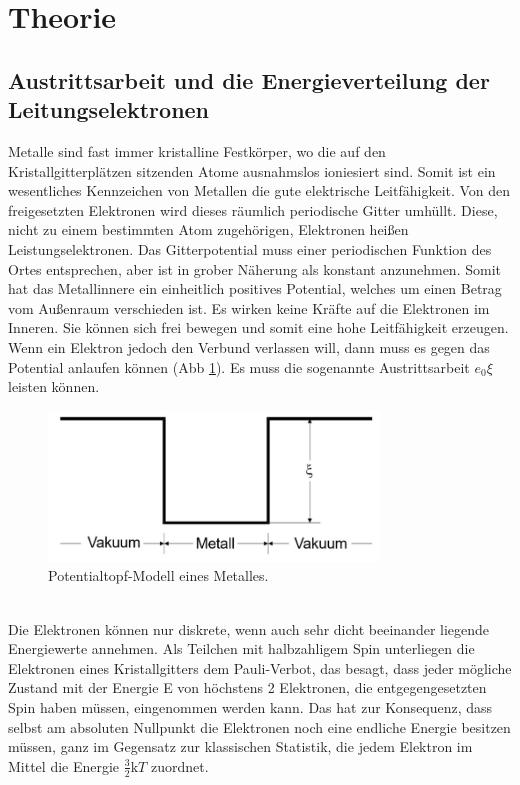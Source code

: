 \section{Theorie}
\label{sec:Theorie}

\subsection{Austrittsarbeit und die Energieverteilung der Leitungselektronen}
Metalle sind fast immer kristalline Festkörper, wo die auf den Kristallgitterplätzen sitzenden Atome ausnahmslos ioniesiert sind.
Somit ist ein wesentliches Kennzeichen von Metallen die gute elektrische Leitfähigkeit.
Von den freigesetzten Elektronen wird dieses räumlich periodische Gitter umhüllt.
Diese, nicht zu einem bestimmten Atom zugehörigen, Elektronen heißen Leistungselektronen.
Das Gitterpotential muss einer periodischen Funktion des Ortes entsprechen, aber ist in grober Näherung als konstant anzunehmen.
Somit hat das Metallinnere ein einheitlich positives Potential, welches um einen Betrag \Phi vom Außenraum verschieden ist.
Es wirken keine Kräfte auf die Elektronen im Inneren.
Sie können sich frei bewegen und somit eine hohe Leitfähigkeit erzeugen.
Wenn ein Elektron jedoch den Verbund verlassen will, dann muss es gegen das Potential \xi anlaufen können (Abb \ref{fig:abb1}).
Es muss die sogenannte Austrittsarbeit $e_0\xi$ leisten können.
\begin{figure}
    \centering
    \includegraphics[height=4.0cm]{data/abb1.jpg}
    \caption{Potentialtopf-Modell eines Metalles. \cite{V504}}
    \label{fig:abb1}
\end{figure} \\
\noindent
Die Elektronen können nur diskrete, wenn auch sehr dicht beeinander liegende Energiewerte annehmen.
Als Teilchen mit halbzahligem Spin unterliegen die Elektronen eines Kristallgitters dem Pauli-Verbot, das besagt, dass jeder mögliche Zustand mit der Energie E von höchstens 2 Elektronen, die entgegengesetzten Spin haben müssen, eingenommen werden kann.
Das hat zur Konsequenz, dass selbst am absoluten Nullpunkt die Elektronen noch eine endliche Energie besitzen müssen, ganz im Gegensatz zur klassischen Statistik, die jedem Elektron im Mittel die Energie $\frac{3}{2}\text{k}T$ zuordnet.
